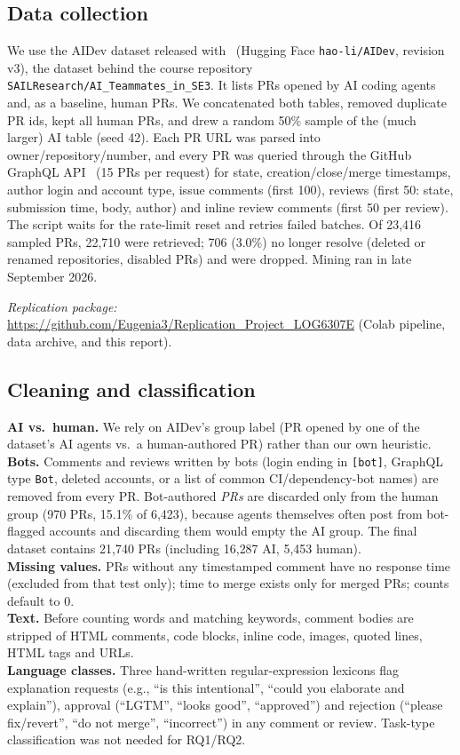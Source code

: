 \documentclass[conference]{IEEEtran}
\begin{document}
\subsection{Data collection}
We use the AIDev dataset released with~\cite{li2025rise} (Hugging Face \texttt{hao-li/AIDev}, revision v3), the dataset behind the course repository \texttt{SAILResearch/AI\_Teammates\_in\_SE3}. It lists PRs opened by AI coding agents and, as a baseline, human PRs. We concatenated both tables, removed duplicate PR ids, kept all human PRs, and drew a random 50\% sample of the (much larger) AI table (seed 42). Each PR URL was parsed into owner/repository/number, and every PR was queried through the GitHub GraphQL API~\cite{githubgql} (15 PRs per request) for state, creation/close/merge timestamps, author login and account type, issue comments (first 100), reviews (first 50: state, submission time, body, author) and inline review comments (first 50 per review). The script waits for the rate-limit reset and retries failed batches. Of 23{,}416 sampled PRs, 22{,}710 were retrieved; 706 (3.0\%) no longer resolve (deleted or renamed repositories, disabled PRs) and were dropped. Mining ran in late September 2026.

\emph{Replication package:} \url{https://github.com/Eugenia3/Replication_Project_LOG6307E} (Colab pipeline, data archive, and this report).

\subsection{Cleaning and classification}
\textbf{AI vs.\ human.} We rely on AIDev's group label (PR opened by one of the dataset's AI agents vs.\ a human-authored PR) rather than our own heuristic. \\
\textbf{Bots.} Comments and reviews written by bots (login ending in \texttt{[bot]}, GraphQL type \texttt{Bot}, deleted accounts, or a list of common CI/dependency-bot names) are removed from every PR. Bot-authored \emph{PRs} are discarded only from the human group (970 PRs, 15.1\% of 6{,}423), because agents themselves often post from bot-flagged accounts and discarding them would empty the AI group. The final dataset contains 21{,}740 PRs (including 16{,}287 AI, 5{,}453 human). \\
\textbf{Missing values.} PRs without any timestamped comment have no response time (excluded from that test only); time to merge exists only for merged PRs; counts default to 0. \\
\textbf{Text.} Before counting words and matching keywords, comment bodies are stripped of HTML comments, code blocks, inline code, images, quoted lines, HTML tags and URLs. \\
\textbf{Language classes.} Three hand-written regular-expression lexicons flag explanation requests (e.g., ``is this intentional'', ``could you elaborate and explain''), approval (``LGTM'', ``looks good'', ``approved'') and rejection (``please fix/revert'', ``do not merge'', ``incorrect'') in any comment or review. Task-type classification was not needed for RQ1/RQ2.
\end{document}
